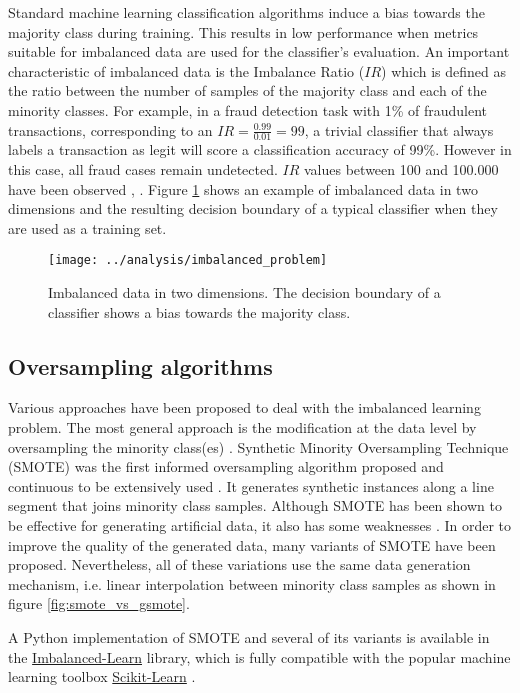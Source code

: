 \documentclass[preprint,12pt, a4paper]{elsarticle}
\begin{document}
Standard machine learning classification algorithms induce a bias towards the majority class during training. This results in low performance when metrics suitable for imbalanced data are used for the classifier's evaluation. An important characteristic of imbalanced data is the Imbalance Ratio ($IR$) which is defined as the ratio between the number of samples of the majority class and each of the minority classes. For example, in a fraud detection task with 1\% of fraudulent transactions, corresponding to an $IR=\frac{0.99}{0.01}=99$, a trivial classifier that always labels a transaction as legit will score a classification accuracy of 99\%. However in this case, all fraud cases remain undetected. $IR$ values between 100 and 100.000 have been observed \cite{Chawla2002}, \cite{Barua2014}. Figure \ref{fig:imbalanced} shows an example of imbalanced data in two dimensions and the resulting decision boundary of a typical classifier when they are used as a training set.

\begin{figure}[H]
	\centering
    \texttt{[image: ../analysis/imbalanced\_problem]}
    \caption{Imbalanced data in two dimensions. The decision boundary of a classifier shows a bias towards the majority class.}
    \label{fig:imbalanced}
\end{figure}

\subsection{Oversampling algorithms}
\label{oversampling}

Various approaches have been proposed to deal with the imbalanced learning problem. The most general approach is the modification at the data level by oversampling the minority class(es) \cite{Fernandez2013}. Synthetic Minority
Oversampling Technique (SMOTE) was the first informed oversampling algorithm proposed and continuous to be extensively used \cite{Chawla2002}. It generates synthetic instances along a line segment that joins minority class samples. Although SMOTE has been shown to be effective for generating artificial data, it also has some weaknesses \cite{He2009}. In order to improve the quality of the generated data, many variants of SMOTE have been proposed. Nevertheless, all of these variations use the same data generation mechanism, i.e. linear interpolation between minority class samples as shown in figure \ref{fig:smote_vs_gsmote}.

A Python implementation of SMOTE and several of its variants is available in the \href{https://imbalanced-learn.org/stable/}{Imbalanced-Learn} \cite{Lemaitre2016} library, which is fully compatible with the popular machine learning toolbox \href{https://scikit-learn.org/stable/}{Scikit-Learn} \cite{Pedregosa2011}. 
\end{document}
